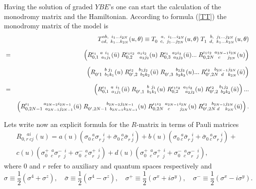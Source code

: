 \documentclass[a4paper,11pt]{article}
\begin{document}
Having the solution of graded $YBE$'s one can start the
calculation of the monodromy matrix and the Hamiltonian.
According to formula (\ref{TT}) the monodromy matrix of the
model is
\begin{eqnarray}
\label{mm}
&&\hspace{-20mm}
T^{ab,\;\; i_1...i_{2N}}_{cd,\;\; k_1...k_{2N}}(u,\theta)\equiv
T^{\;\;\,\;a ,\;\; i_1...i_{2N}}_{0\;\;c,\;\; j_1...j_{2N}}(u,
\theta) \;
T^{\;\;\,\;b ,\;\; j_1...j_{2N}}_{1\;\;d,\;\; k_1...k_{2N}
}(u,\theta)\nonumber\\[2mm]
&=&\left(R^{\iota_1\;\;\, a\;\, i_1}_{0,1\;\;a_1j_1}(\bar u)
\;R^{\iota_1\iota_2\;\; a_1i_2}_{0,2\;\;\;\;\;a_2j_2}(u)\;R^{\iota_1\;\;\, 
a_2i_3}_{0,3\;\;a_3j_3}(\bar u)...\;R^{\iota_1\iota_2\;\; a_{2N-1}i_{2N}}_
{0,2N\;\;\;c\;\;\;\;\;j_{2N}}(u)\right)\nonumber\\[2mm]
&&\left(R^{\;\;\;\;\;\;\, b\; j_1}_{0^\prime 1\;\;b_1k_1}(u)
\;R^{\iota_2\;\;\;\, b_1j_2}_{0^\prime ,2\;\;b_2k_2}(\bar u) 
\;R^{\;\;\;\;\;\;\;\, b_2j_3}_{0^\prime ,3\;\;b_3k_3}(u)...
\;R^{\iota_2\;\;\; b_{2N-1}j_{2N}}_{0^\prime ,2N\;\;d\;\;\;k_{2N}}
(\bar u)\right)\\[2mm]
&=&\left(R^{\iota_1\;\;\; a\;\, i_1}_{0,1\;\;a_1j_1}(\bar u)
\;R^{\;\;\;\;\;\;\;\, b\;\, j_1}_{0^\prime ,1\;\;b_1k_1}(u) 
\;R^{\iota_1\iota_2\;\; a_1i_2}_{0,2\;\;\;\;\;a_2j_2}(u)
\;R^{\iota_2\;\;\;\, b_1j_2}_{0^\prime ,2\;\;b_2k_2}(\bar u)\right)...\nonumber
\\[2mm]
&&
\left(R^{\iota_1\;\;\;\;\;\; \;\;\;\;
a_{2N-2}i_{2N-1}}_{0,2N-1\;\;a_{2N-1}j_{2N-1}}(\bar u)
\;R^{\;\;\;\;\;\;\;\;\;\;\;\;\; b_{2N-2}j_{2N-1}}_{0^\prime
,2N-1\;\;b_{2N-1}k_{2N-1}}(u)\;R^{\iota_1\iota_2\;\;\, a_{2N-1}i_{2N}}_
{0,2N\;\;\;c\;\;\;\;\;\;\; j_{2N}}(u)   \;R^{\iota_2\;\;\; b_{2N-1}
j_{2N}}_{0^\prime ,2N\;d\;\;\;\;k_{2N}}(\bar u)\right).
\end{eqnarray}

Lets write now an explicit formula for the $R$-matrix
in terms of Pauli matrices
\begin{eqnarray}
\label{rmat}
R^{\;\;\;\; ai}_{0,r\;cj}(u)=
a(u)\left(\sigma^{\;\;\; a}_{0\; c}
\sigma^{\;\;\; i}_{r\; j}+
\bar\sigma^{\;\;\; a}_{0\; c}\bar\sigma^{\;\;\; i}_{r\; j}\right)
+b(u)\left(\sigma^{\;\;\; a}_{0\; c}\bar\sigma^{\;\;\; i}_{r\; j}+
\bar\sigma^{\;\;\; a}_{0\; c}\sigma^{\;\;\; i}_{r\; j}\right)+\nonumber\\
c(u)\left(\sigma^{+\;\; a}_{0\;\;\, c}\sigma^{-\;\; i}_{r\;\;\, j}+
\sigma^{-\;\; a}_{0\;\;\, c}\sigma^{+\;\; i}_{r\;\;\, j}\right)+
d(u)\left(\sigma^{+\;\; a}_{0\;\;\, c}\sigma^{+\;\; i}_{r\;\;\, j}+
\sigma^{-\;\; a}_{0\;\;\, c}\sigma^{-\;\; i}_{r\;\;\, j}\right),
\end{eqnarray}
where $0$ and $r$ refer to auxiliary and quantum spaces 
respectively and
$$
\sigma\equiv\frac 12\left(\sigma^4+\sigma^z\right), \quad
\bar\sigma\equiv\frac 12\left(\sigma^4-\sigma^z\right), \quad
\sigma^+\equiv\frac 12\left(\sigma^x+i\sigma^y\right), \quad
\sigma^-\equiv\frac 12\left(\sigma^x-i\sigma^y\right).
$$
\end{document}
